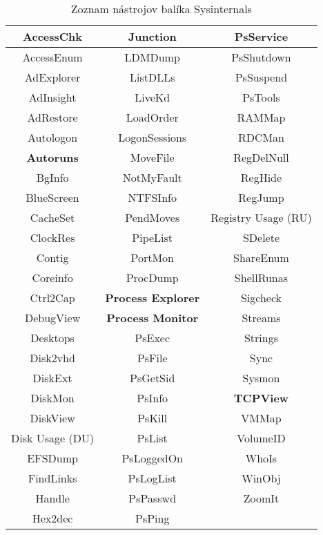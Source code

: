 \documentclass[conference]{IEEEtran}
\begin{document}
\begin{table}[htbp]
    \caption{Zoznam nástrojov balíka Sysinternals}
    \begin{center}
    \begin{tabular}{|c|c|c|}
    \hline
    AccessChk & Junction & PsService \\ \hline
    AccessEnum & LDMDump & PsShutdown \\ \hline
    AdExplorer & ListDLLs & PsSuspend \\ \hline
    AdInsight & LiveKd & PsTools \\ \hline
    AdRestore & LoadOrder & RAMMap \\ \hline
    Autologon & LogonSessions & RDCMan \\ \hline
    \textbf{Autoruns} & MoveFile & RegDelNull \\ \hline
    BgInfo & NotMyFault & RegHide \\ \hline
    BlueScreen & NTFSInfo & RegJump \\ \hline
    CacheSet & PendMoves & Registry Usage (RU) \\ \hline
    ClockRes & PipeList & SDelete \\ \hline
    Contig & PortMon & ShareEnum \\ \hline
    Coreinfo & ProcDump & ShellRunas \\ \hline
    Ctrl2Cap & \textbf{Process Explorer} & Sigcheck \\ \hline
    DebugView & \textbf{Process Monitor} & Streams \\ \hline
    Desktops & PsExec & Strings \\ \hline
    Disk2vhd & PsFile & Sync \\ \hline
    DiskExt & PsGetSid & Sysmon \\ \hline
    DiskMon & PsInfo & \textbf{TCPView} \\ \hline
    DiskView & PsKill & VMMap \\ \hline
    Disk Usage (DU) & PsList & VolumeID \\ \hline
    EFSDump & PsLoggedOn & WhoIs \\ \hline
    FindLinks & PsLogList & WinObj \\ \hline
    Handle & PsPasswd & ZoomIt \\ \hline
    Hex2dec & PsPing & \\ \hline
    \end{tabular}
    \label{tab1}
    \end{center}
\end{table}
\end{document}

